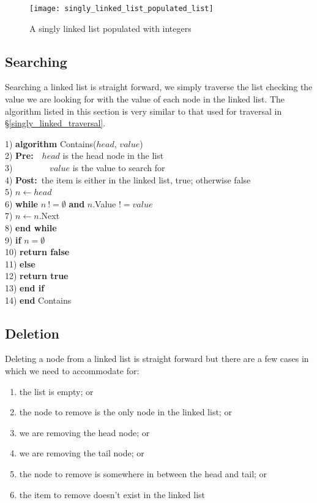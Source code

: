 \begin{figure}
\begin{center}
\texttt{[image: singly\_linked\_list\_populated\_list]}
\end{center}
\caption{A singly linked list populated with integers} \label{fig:singly_populated_list}
\end{figure}

\subsection{Searching} \label{single_search}
Searching a linked list is straight forward, we simply traverse the list checking the value we are looking for with the value of each node in the linked list. The algorithm listed in this section is very similar to that used for traversal in \S\ref{singly_linked_traversal}.

\begin{tabbing}
1)  \textbf{alg}\= \textbf{orithm} Contains($head$, $value$) \\
2)  \> \textbf{Pre:}~~$head$ is the head node in the list \\
3)  \> ~~~~~~~~$value$ is the value to search for \\
4)  \> \textbf{Post:}~the item is either in the linked list, true; otherwise false \\
5)  \> $n \leftarrow head$ \\
6)  \> \textbf{whi}\= \textbf{le} $n~!= \emptyset$ \textbf{and} $n$.Value $!= value$ \\
7)  \> \> $n \leftarrow n$.Next \\
8)  \> \textbf{end while} \\
9)  \> \textbf{if} $n = \emptyset$ \\
10) \> \> \textbf{return false} \\
11) \> \textbf{else} \\
12) \> \> \textbf{return true} \\
13) \> \textbf{end if} \\
14) \textbf{end} Contains \\
\end{tabbing}

\subsection{Deletion} \label{single_deletion}
Deleting a node from a linked list is straight forward but there are a few cases in which we need to accommodate for:
\begin{enumerate}
\item the list is empty; or
\item the node to remove is the only node in the linked list; or 
\item we are removing the head node; or
\item we are removing the tail node; or
\item the node to remove is somewhere in between the head and tail; or
\item the item to remove doesn't exist in the linked list
\end{enumerate}

